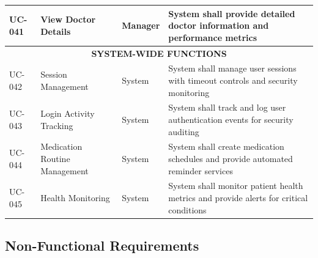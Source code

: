 \documentclass[12pt,a4paper]{article}
\begin{document}
\begin{longtable}{|p{1.2cm}|p{2.5cm}|p{3.5cm}|p{6.8cm}|}
\hline
UC-041 & View Doctor Details & Manager & System shall provide detailed doctor information and performance metrics \\
\hline
\multicolumn{4}{|c|}{\textbf{SYSTEM-WIDE FUNCTIONS}} \\
\hline
UC-042 & Session Management & System & System shall manage user sessions with timeout controls and security monitoring \\
\hline
UC-043 & Login Activity Tracking & System & System shall track and log user authentication events for security auditing \\
\hline
UC-044 & Medication Routine Management & System & System shall create medication schedules and provide automated reminder services \\
\hline
UC-045 & Health Monitoring & System & System shall monitor patient health metrics and provide alerts for critical conditions \\
\hline
\end{longtable}

\subsection{Non-Functional Requirements}
\end{document}
